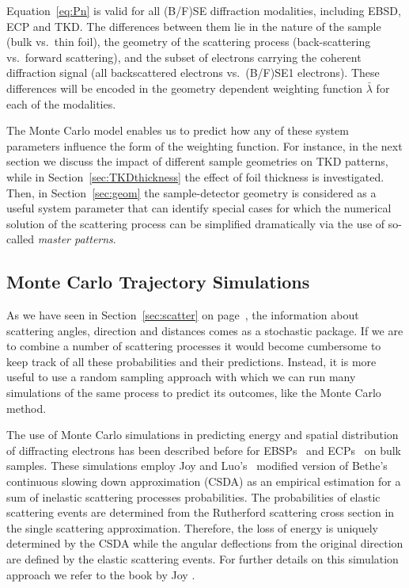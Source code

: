 Equation~\ref{eq:Pn} is valid for all (B/F)SE diffraction modalities, including EBSD, ECP and TKD. The differences between them lie in the nature of the sample (bulk vs.\ thin foil), the geometry of the scattering process (back-scattering vs.\ forward scattering), and the subset of electrons carrying the coherent diffraction signal (all backscattered electrons vs.\ (B/F)SE1 electrons). These differences will be encoded in the geometry dependent weighting function $\bar{\lambda}$ for each of the modalities. 

The Monte Carlo model enables us to predict how any of these system parameters influence the form of the weighting function. For instance, in the next section we discuss the impact of different sample geometries on TKD patterns, while in Section~\ref{sec:TKDthickness} the effect of foil thickness is investigated. Then, in Section~\ref{sec:geom} the sample-detector geometry is considered as a useful system parameter that can identify special cases for which the numerical solution of the scattering process can be simplified dramatically via the use of so-called \textit{master patterns}. 


\subsection{Monte Carlo Trajectory Simulations }
\label{sec:MC}

As we have seen in Section~\ref{sec:scatter} on page~\pageref{sec:scatter}, the information about scattering angles, direction and distances comes as a stochastic package.  If we are to combine a number of scattering processes it would become cumbersome to keep track of all these probabilities and their predictions. Instead, it is more useful to use a random sampling approach with which we can run many simulations of the same process to predict its outcomes, like the Monte Carlo method.


The use of Monte Carlo simulations in predicting energy and spatial distribution of diffracting electrons has been described before for EBSPs~\cite{degraef2013e} and ECPs~\cite{degraef2017k} on bulk samples. These simulations employ Joy and Luo's~\cite{joy1989} modified version of Bethe's continuous slowing down approximation (CSDA) as an empirical estimation for a sum of inelastic scattering processes probabilities. The probabilities of elastic scattering events are determined from the Rutherford scattering cross section in the single scattering approximation. Therefore, the loss of energy is uniquely determined by the CSDA while the angular deflections from the original direction are defined by the elastic scattering events. For further details on this simulation approach we refer to the book by Joy \cite{joy1995a}. 


